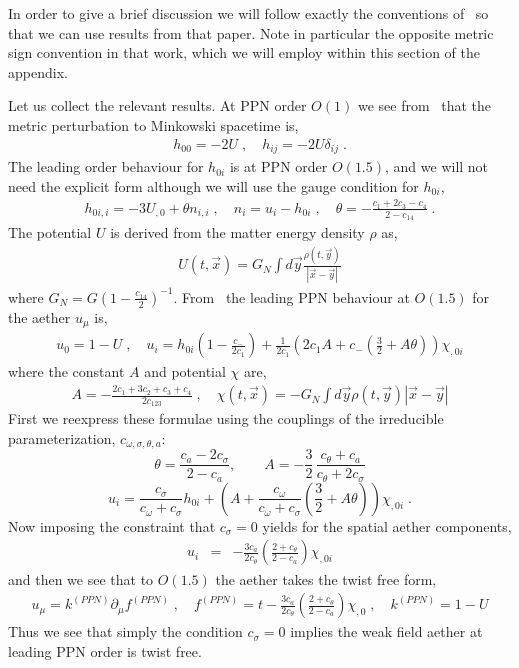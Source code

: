 \documentclass[12pt]{article}
\numberwithin{equation}{section}
\begin{document}
In order to give a brief discussion we will follow exactly the conventions of~\cite{Foster:2005dk} so that we can use results from that paper. Note in particular the opposite metric sign convention in that work, which we will employ within this section of the appendix.

Let us collect the relevant results. At PPN order $O(1)$ we see from~\cite{Foster:2005dk} that the metric perturbation to Minkowski spacetime is, 
\begin{eqnarray}
h_{00} = - 2 U \; , \quad h_{ij} = - 2 U \delta_{ij} \; .
\end{eqnarray}
The leading order behaviour for $h_{0i}$ is at PPN order $O(1.5)$, and we will not need the explicit form although we will use the gauge condition for $h_{0i}$,
\begin{eqnarray}\label{B2}
h_{0i,i} = -3 U_{,0} + \theta n_{i,i} \; , \quad n_i = u_i - h_{0i} \; , \quad \theta = - \frac{c_1 + 2 c_3 - c_4}{2 - c_{14}} \; .
\end{eqnarray}
The potential $U$ is derived from the matter energy density $\rho$ as,
\begin{eqnarray}
U(t,\vec{x}) = G_N \int d\vec{y} \frac{\rho(t,\vec{y})}{| \vec{x} - \vec{y} |}
\end{eqnarray}
where $G_N = G (1 - \frac{c_{14}}{2} )^{-1}$.
From~\cite{Foster:2005dk} the leading PPN behaviour at $O(1.5)$ for the aether $u_\mu$ is,
\begin{eqnarray}
u_0 = 1 - U
\; , \quad
u_i =  h_{0i} \left( 1 -  \frac{c_-}{2 c_1} \right)  + \frac{1}{2 c_1}  \left( 2 c_1 A + c_- \left( \frac{3}{2} + A \theta \right) \right) \chi_{,0i}  
\end{eqnarray}
where the constant $A$ and potential $\chi$ are,
\begin{eqnarray}
A = - \frac{2 c_1 + 3 c_2 + c_3 + c_4}{2 c_{123}} \; , \quad \chi(t,\vec{x}) = - G_N \int d\vec{y} \rho(t,\vec{y}) | \vec{x} - \vec{y} |
\end{eqnarray}
First we reexpress these formulae using the couplings of the irreducible parameterization, $c_{\omega,\sigma,\theta,a}$: 
%
\[\theta = \frac{c_a-2c_\sigma}{2-c_a},\qquad
A= -\frac32\,\frac{c_\theta + c_a}{c_\theta +2c_\sigma}
\]
%
\[
u_i =  \frac{c_\sigma}{c_\omega+c_\sigma}
h_{0i}  + \left(A+\frac{c_\omega}{c_\omega+
c_\sigma}\left(\frac32+ A\theta\right)\right) \chi_{,0i} \; .
\] 
%
Now imposing the constraint that
$c_\sigma=0$ yields for the spatial 
aether components,
\begin{eqnarray}
\label{ueq}
u_i &=& - \frac{3 c_a}{2 c_\theta} \left(  \frac{  2 + c_\theta   }{ 2 - c_{a}}   \right) \chi_{,0i}
\end{eqnarray}
and then we see that to $O(1.5)$ the aether takes the twist free form,
\begin{eqnarray}
\label{eq:PPNtwistfree}
u_\mu = k^{(PPN)} \partial_\mu f^{(PPN)} \; , \quad f^{(PPN)} = t - \frac{3 c_a}{2 c_\theta} \left(  \frac{  2 + c_\theta   }{ 2 - c_{a}}   \right) \chi_{,0} \; , \quad k^{(PPN)} = 1 - U
\end{eqnarray}
Thus we see that simply the condition $c_\sigma = 0$ implies the weak field aether at leading PPN order is twist free.
\end{document}
